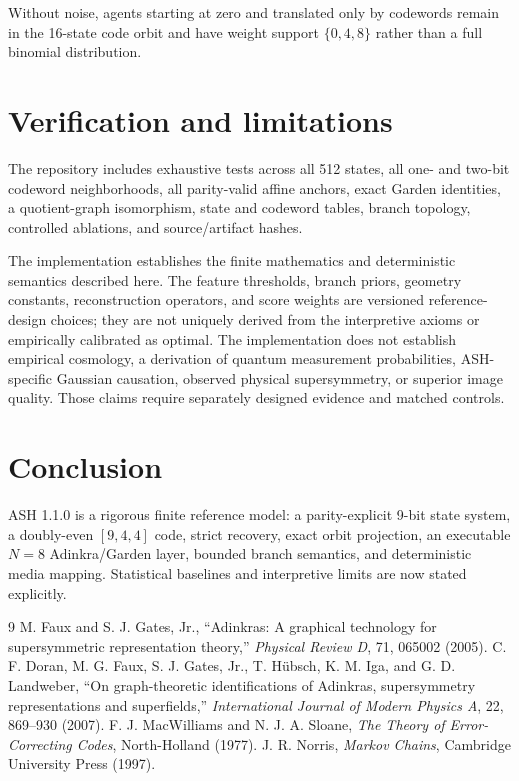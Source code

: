 \documentclass[11pt]{article}
\begin{document}
Without noise, agents starting at zero and translated only by codewords remain in the 16-state code orbit and have weight support $\{0,4,8\}$ rather than a full binomial distribution.

\section{Verification and limitations}
The repository includes exhaustive tests across all 512 states, all one- and two-bit codeword neighborhoods, all parity-valid affine anchors, exact Garden identities, a quotient-graph isomorphism, state and codeword tables, branch topology, controlled ablations, and source/artifact hashes.

The implementation establishes the finite mathematics and deterministic semantics described here.  The feature thresholds, branch priors, geometry constants, reconstruction operators, and score weights are versioned reference-design choices; they are not uniquely derived from the interpretive axioms or empirically calibrated as optimal.  The implementation does not establish empirical cosmology, a derivation of quantum measurement probabilities, ASH-specific Gaussian causation, observed physical supersymmetry, or superior image quality.  Those claims require separately designed evidence and matched controls.

\section{Conclusion}
ASH 1.1.0 is a rigorous finite reference model: a parity-explicit 9-bit state system, a doubly-even $[9,4,4]$ code, strict recovery, exact orbit projection, an executable $N=8$ Adinkra/Garden layer, bounded branch semantics, and deterministic media mapping.  Statistical baselines and interpretive limits are now stated explicitly.

\begin{thebibliography}{9}
 M. Faux and S. J. Gates, Jr., ``Adinkras: A graphical technology for supersymmetric representation theory,'' \emph{Physical Review D}, 71, 065002 (2005).
 C. F. Doran, M. G. Faux, S. J. Gates, Jr., T. H\"ubsch, K. M. Iga, and G. D. Landweber, ``On graph-theoretic identifications of Adinkras, supersymmetry representations and superfields,'' \emph{International Journal of Modern Physics A}, 22, 869--930 (2007).
 F. J. MacWilliams and N. J. A. Sloane, \emph{The Theory of Error-Correcting Codes}, North-Holland (1977).
 J. R. Norris, \emph{Markov Chains}, Cambridge University Press (1997).
\end{thebibliography}
\end{document}
